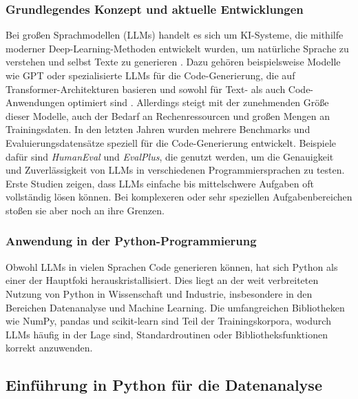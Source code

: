 \documentclass[11pt,a4paper]{article}
\begin{document}
\subsubsection{Grundlegendes Konzept und aktuelle Entwicklungen}
Bei großen Sprachmodellen (LLMs) handelt es sich um KI-Systeme, die mithilfe moderner Deep-Learning-Methoden entwickelt wurden, um natürliche Sprache zu verstehen und selbst Texte zu generieren \cite{naveed2024comprehensiveoverviewlargelanguage}. Dazu gehören beispielsweise Modelle wie GPT oder spezialisierte LLMs für die Code-Generierung, die auf Transformer-Architekturen basieren und sowohl für Text- als auch Code-Anwendungen optimiert sind \cite{NEURIPS2023_43e9d647, nijkamp2023codegenopenlargelanguage, 9413901}. Allerdings steigt mit der zunehmenden Größe dieser Modelle, auch der Bedarf an Rechenressourcen und großen Mengen an Trainingsdaten.
In den letzten Jahren wurden mehrere Benchmarks und Evaluierungsdatensätze speziell für die Code-Generierung entwickelt. Beispiele dafür sind \emph{HumanEval}\cite{chen2021evaluatinglargelanguagemodels} und \emph{EvalPlus}\cite{evalplus}, die genutzt werden, um die Genauigkeit und Zuverlässigkeit von LLMs in verschiedenen Programmiersprachen zu testen. Erste Studien zeigen, dass LLMs einfache bis mittelschwere Aufgaben oft vollständig lösen können. Bei komplexeren oder sehr speziellen Aufgabenbereichen stoßen sie aber noch an ihre Grenzen\cite{wang2021codet5identifierawareunifiedpretrained}.

\subsubsection{Anwendung in der Python-Programmierung}
Obwohl LLMs in vielen Sprachen Code generieren können, hat sich Python als einer der Hauptfoki herauskristallisiert. Dies liegt an der weit verbreiteten Nutzung von Python in Wissenschaft und Industrie, insbesondere in den Bereichen Datenanalyse und Machine Learning. Die umfangreichen Bibliotheken wie NumPy, pandas und scikit-learn sind Teil der Trainingskorpora, wodurch LLMs häufig in der Lage sind, Standardroutinen oder Bibliotheksfunktionen korrekt anzuwenden\cite{chen2021evaluatinglargelanguagemodels}.

\subsection{Einführung in Python für die Datenanalyse}
\label{sec:Python}
\end{document}
